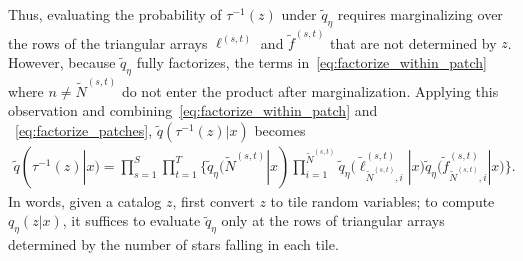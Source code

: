 Thus, evaluating the probability of $\tau^{-1}(z)$ under $\tilde q_\eta$ requires marginalizing over the rows of the triangular arrays $\ell^{(s, t)}$ and $\tilde f^{(s, t)}$ that are not determined by $z$. However, 
because $\tilde q_\eta$ fully factorizes, the terms 
in~\eqref{eq:factorize_within_patch} where $n \not= \tilde N^{(s,t)}$ do not enter the
product
after marginalization.
Applying this observation and combining~\eqref{eq:factorize_within_patch} and ~\eqref{eq:factorize_patches}, $\tilde q(\tau^{-1}(z) | x)$ becomes
\begin{align}
    \tilde q(\tau^{-1}(z) | x) = \prod_{s=1}^S\prod_{t=1}^T
    \Big\{
    \tilde q_\eta(\tilde N^{(s,t)} | x) 
    \prod_{i = 1}^{\tilde N^{(s,t)}}
    \tilde q_\eta\big(\tilde \ell_{\tilde N^{(s,t)},i}^{(s, t)} | x\big)
    \tilde q_\eta\big(\tilde f_{\tilde N^{(s,t)},i}^{(s, t)} | x\big)
    \Big\}.
\end{align}
In words, given a catalog $z$,
first convert $z$ to tile random variables;
to compute $q_\eta(z | x)$, it suffices to evaluate $\tilde q_\eta$ only at the rows of triangular 
arrays determined by the number 
of stars falling in each tile. 



